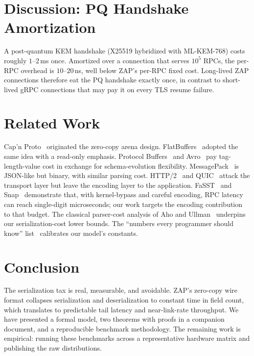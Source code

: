 \documentclass[11pt]{article}
\theoremstyle{definition}
\theoremstyle{remark}
\begin{document}
\section{Discussion: PQ Handshake Amortization}
\label{sec:pq}

A post-quantum KEM handshake (X25519 hybridized with ML-KEM-768)
costs roughly $1$--$2$\,ms once. Amortized over a connection that
serves $10^5$ RPCs, the per-RPC overhead is $10$--$20$\,ns, well below
ZAP's per-RPC fixed cost. Long-lived ZAP connections therefore eat
the PQ handshake exactly once, in contrast to short-lived gRPC
connections that may pay it on every TLS resume failure.

\section{Related Work}
\label{sec:related}

Cap'n Proto~\cite{capnproto} originated the zero-copy arena design.
FlatBuffers~\cite{flatbuffers} adopted the same idea with a
read-only emphasis. Protocol Buffers~\cite{protobuf} and
Avro~\cite{avro} pay tag-length-value cost in exchange for
schema-evolution flexibility. MessagePack~\cite{msgpack} is JSON-like
but binary, with similar parsing cost.
HTTP/2~\cite{rfc9113} and QUIC~\cite{rfc9000} attack the transport
layer but leave the encoding layer to the application.
FaSST~\cite{kalia2016fasst} and Snap~\cite{marty2019snap}
demonstrate that, with kernel-bypass and careful encoding, RPC
latency can reach single-digit microseconds; our work targets the
encoding contribution to that budget.
The classical parser-cost analysis of Aho and Ullman~\cite{ahoullman1972}
underpins our serialization-cost lower bounds.
The ``numbers every programmer should know'' list~\cite{deannumbers}
calibrates our model's constants.

\section{Conclusion}
\label{sec:conclusion}

The serialization tax is real, measurable, and avoidable. ZAP's
zero-copy wire format collapses serialization and deserialization to
constant time in field count, which translates to predictable tail
latency and near-link-rate throughput. We have presented a formal
model, two theorems with proofs in a companion document, and a
reproducible benchmark methodology. The remaining work is empirical:
running these benchmarks across a representative hardware matrix and
publishing the raw distributions.

\printbibliography
\end{document}
